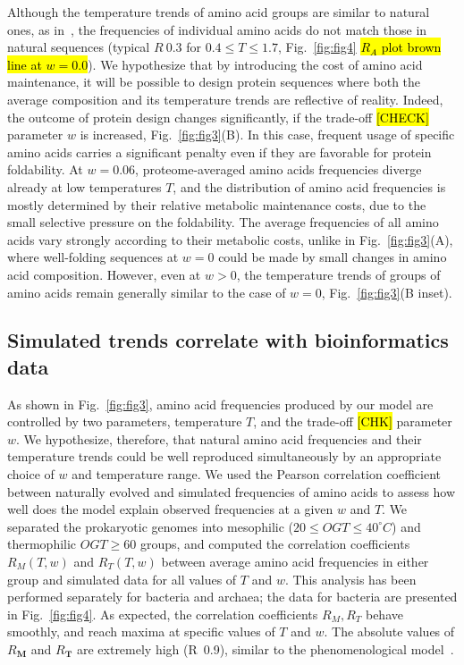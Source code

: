 \documentclass[10pt,letterpaper]{article}
\begin{document}

Although the temperature trends of amino acid groups are similar to natural ones, as in~\cite{Berezovsky2007Positive}, the frequencies of individual amino acids do not match those in natural sequences (typical $R~0.3$ for $0.4\leq T\leq 1.7$, Fig.~\ref{fig:fig4} \hl{$R_A$ plot brown line at $w=0.0$}).  We hypothesize that by introducing the cost of amino acid maintenance, it will be possible to design protein sequences where both the average composition and its temperature trends are reflective of reality. Indeed, the outcome of protein design changes significantly, if the  trade-off \hl{[CHECK]} parameter $\mathit{w}$ is increased, Fig.~\ref{fig:fig3}(B). In this case, frequent usage of specific amino acids carries a significant penalty even if they are favorable for protein foldability.
At $\mathit{w}=0.06$, proteome-averaged amino acids frequencies diverge already at low temperatures $T$, 
and the distribution of amino acid frequencies is mostly determined by their relative metabolic maintenance costs, due to the small selective pressure on the foldability. The average frequencies of all amino acids vary strongly according to their metabolic costs, unlike in Fig.~\ref{fig:fig3}(A), where well-folding sequences at $w=0$ could be made by small changes in amino acid composition. However, even at $w>0$, the temperature trends of groups of amino acids remain generally similar to the case of $w=0$,  Fig.~\ref{fig:fig3}(B inset).


\subsection*{Simulated trends correlate with bioinformatics data}

As shown in Fig.~\ref{fig:fig3}, amino acid frequencies produced by our model are controlled by two parameters, temperature $T$, and the trade-off \hl{[CHK]} parameter $w$. We hypothesize, therefore, that natural amino acid frequencies and their temperature trends could be well reproduced simultaneously by an appropriate choice of $w$ and temperature range. We used the Pearson correlation coefficient between naturally evolved and simulated frequencies of amino acids to assess how well does the model explain observed frequencies at a given $\mathit{w}$ and $T$. We separated the prokaryotic genomes into mesophilic ($20\leq OGT\leq 40^\circ C$) and thermophilic  $OGT\geq 60$ groups, and computed the correlation coefficients $R_M(T,w)$ and $R_T(T,w)$ between average amino acid frequencies in either group and simulated data for all values of $T$ and $w$. This analysis has been performed separately for bacteria and archaea; the data for bacteria are presented in Fig.~\ref{fig:fig4}. As expected, the correlation coefficients $R_M, R_T$ behave smoothly, and reach maxima at specific values of $T$ and $w$. The absolute values of $R_{\mathbf{M}}$ and $R_{\mathbf{T}}$ are extremely high (R~0.9), similar to the phenomenological model~\cite{Krick2014Amino}. 
\end{document}
